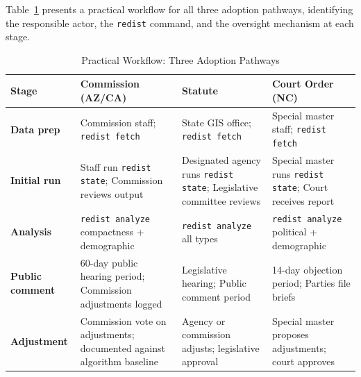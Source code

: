 \label{sec:workflow}

Table~\ref{tab:workflow} presents a practical workflow for all three adoption
pathways, identifying the responsible actor, the \texttt{redist} command,
and the oversight mechanism at each stage.

\begin{table}[h]
\centering
\caption{Practical Workflow: Three Adoption Pathways}
\label{tab:workflow}
\begin{threeparttable}
\begin{tabular}{p{2cm}p{3.5cm}p{3.5cm}p{3.5cm}}
\toprule
Stage & Commission (AZ/CA) & Statute & Court Order (NC) \\
\midrule
\textbf{Data prep} &
Commission staff; \newline
\texttt{redist fetch} &
State GIS office; \newline
\texttt{redist fetch} &
Special master staff; \newline
\texttt{redist fetch} \\
\addlinespace
\textbf{Initial run} &
Staff run \texttt{redist state}; \newline
Commission reviews output &
Designated agency runs \texttt{redist state}; \newline
Legislative committee reviews &
Special master runs \texttt{redist state}; \newline
Court receives report \\
\addlinespace
\textbf{Analysis} &
\texttt{redist analyze} \newline compactness + demographic &
\texttt{redist analyze} \newline all types &
\texttt{redist analyze} \newline political + demographic \\
\addlinespace
\textbf{Public comment} &
60-day public hearing period; \newline Commission adjustments logged &
Legislative hearing; \newline Public comment period &
14-day objection period; \newline Parties file briefs \\
\addlinespace
\textbf{Adjustment} &
Commission vote on adjustments; \newline documented against algorithm baseline &
Agency or commission adjusts; \newline legislative approval &
Special master proposes adjustments; \newline court approves \\

\end{tabular}
\end{threeparttable}
\end{table}
